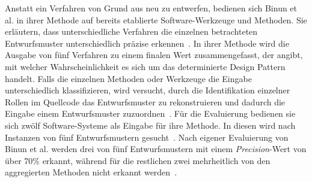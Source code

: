 Anstatt ein Verfahren von Grund aus neu zu entwerfen, bedienen sich Binun et al. in ihrer Methode auf bereits etablierte Software-Werkzeuge und Methoden.
Sie erläutern, dass unterschiedliche Verfahren die einzelnen betrachteten Entwurfsmuster unterschiedlich präzise erkennen~\cite[S.15 - 17]{binun2009}.
In ihrer Methode wird die Ausgabe von fünf Verfahren zu einem finalen Wert zusammengefasst, der angibt, mit welcher Wahrscheinlichkeit es sich um das determinierte Design Pattern handelt.
Falls die einzelnen Methoden oder Werkzeuge die Eingabe unterschiedlich klassifizieren, wird versucht, durch die Identifikation einzelner Rollen im Quellcode das Entwurfsmuster zu rekonstruieren und dadurch die Eingabe einem Entwurfsmuster zuzuordnen~\cite[S. 15 - 16]{binun2009}.
Für die Evaluierung bedienen sie sich zwölf Software-Systeme als Eingabe für ihre Methode. In diesen wird nach Instanzen von fünf Entwurfsmustern gesucht~\cite[S. 9, S. 23]{binun2009}.
Nach eigener Evaluierung von Binun et al. werden drei von fünf Entwurfsmustern mit einem \textit{Precision}-Wert von über 70\% erkannt, während für die restlichen zwei mehrheitlich von den aggregierten Methoden nicht erkannt werden~\cite[S. 22]{binun2009}.

